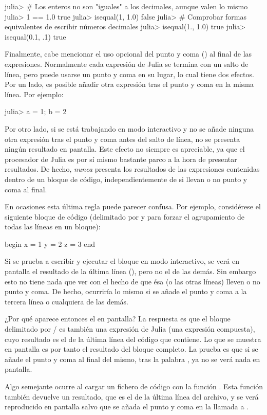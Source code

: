 ﻿\documentclass[spanish]{article}
\begin{document}
julia> # Los enteros no son "iguales" a los decimales, aunque valen lo mismo
julia> 1 == 1.0
true
julia> isequal(1, 1.0)
false
julia> # Comprobar formas equivalentes de escribir números decimales
julia> isequal(1., 1.0)
true
julia> isequal(0.1, .1)
true

Finalmente, cabe mencionar el uso opcional del punto y coma (\code{;}) al final de las expresiones. Normalmente cada expresión de Julia se termina con un salto de línea, pero puede usarse un punto y coma en su lugar, lo cual tiene dos efectos. Por un lado, es posible añadir otra expresión tras el punto y coma en la misma línea. Por ejemplo:

julia> a = 1; b = 2

Por otro lado, si se está trabajando en modo interactivo y no se añade ninguna otra expresión tras el punto y coma antes del salto de línea, no se presenta ningún resultado en pantalla. Este efecto no siempre es apreciable, ya que el procesador de Julia es por sí mismo bastante parco a la hora de presentar resultados. De hecho, \emph{nunca} presenta los resultados de las expresiones contenidas dentro de un bloque de código, independientemente de si llevan o no punto y coma al final.

En ocasiones esta última regla puede parecer confusa. Por ejemplo, considérese el siguiente bloque de código (delimitado por  y  para forzar el agrupamiento de todas las líneas en un bloque):

begin
  x = 1
  y = 2
  z = 3
end

Si se prueba a escribir y ejecutar el bloque en modo interactivo, se verá en pantalla el resultado de la última línea (), pero no el de las demás. Sin embargo esto no tiene nada que ver con el hecho de que ésa (o las otras líneas) lleven o no punto y coma. De hecho, ocurriría lo mismo si se añade el punto y coma a la tercera línea o cualquiera de las demás.

¿Por qué aparece entonces el  en pantalla? La respuesta es que el bloque delimitado por / es también una expresión de Julia (una expresión compuesta), cuyo resultado es el de la última línea del código que contiene. Lo que se muestra en pantalla es por tanto el resultado del bloque completo. La prueba es que si se añade el punto y coma al final del mismo, tras la palabra , ya no se verá nada en pantalla.

Algo semejante ocurre al cargar un fichero de código con la función . Esta función también devuelve un resultado, que es el de la última línea del archivo, y se verá reproducido en pantalla salvo que se añada el punto y coma en la llamada a .
\end{document}
